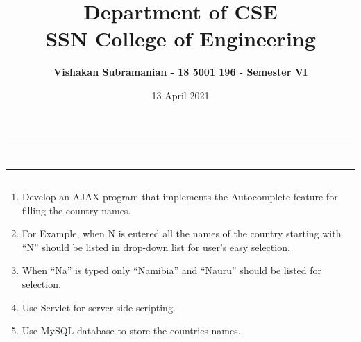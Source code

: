 \documentclass[12pt, a4]{article}
\title{\textbf{Department of CSE\\SSN College of Engineering}}
\author{\textbf{Vishakan Subramanian - 18 5001 196 - Semester VI}}
\date{13 April 2021}
\begin{document}
\maketitle
\hrule
\section*{}
\hrule
\bigskip

\subsection*{}
\subsection*{}
\begin{flushleft}

\begin{enumerate}
\item Develop an AJAX program that implements the Autocomplete feature for filling the country names.
\item For Example, when N is entered all the names of the country starting with “N” should be listed in drop-down list for user’s easy selection.
\item When “Na” is typed only “Namibia” and “Nauru” should be listed for selection.
\item Use Servlet for server side scripting. 
\item Use MySQL database to store the countries names. 
\end{enumerate}
 
\end{flushleft}

\newpage
\subsection*{}
\begin{flushleft}

\end{flushleft}

\newpage
\subsection*{}
\begin{flushleft}

\end{flushleft}
\end{document}

